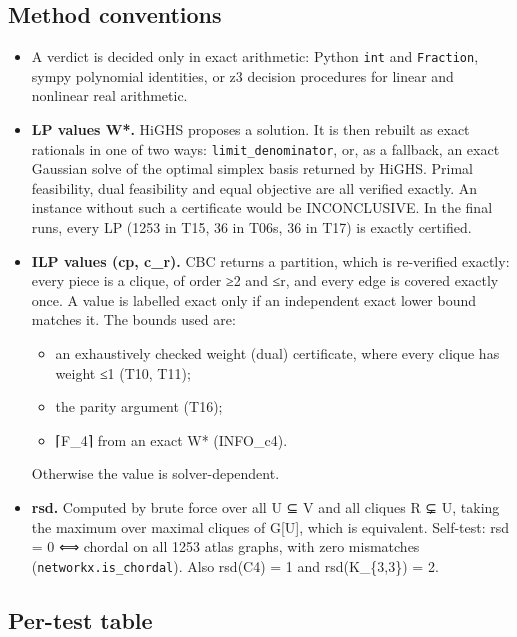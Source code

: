 \documentclass[
]{article}
\providecommand{\tightlist}{%
  \setlength{\itemsep}{0pt}\setlength{\parskip}{0pt}}
\begin{document}
\subsection{Method conventions}\label{method-conventions}

\begin{itemize}
\item
  A verdict is decided only in exact arithmetic: Python \texttt{int} and
  \texttt{Fraction}, sympy polynomial identities, or z3 decision
  procedures for linear and nonlinear real arithmetic.
\item
  \textbf{LP values W*.} HiGHS proposes a solution. It is then rebuilt
  as exact rationals in one of two ways: \texttt{limit\_denominator},
  or, as a fallback, an exact Gaussian solve of the optimal simplex
  basis returned by HiGHS. Primal feasibility, dual feasibility and
  equal objective are all verified exactly. An instance without such a
  certificate would be INCONCLUSIVE. In the final runs, every LP (1253
  in T15, 36 in T06s, 36 in T17) is exactly certified.
\item
  \textbf{ILP values (cp, c\_r).} CBC returns a partition, which is
  re-verified exactly: every piece is a clique, of order ≥2 and ≤r, and
  every edge is covered exactly once. A value is labelled exact only if
  an independent exact lower bound matches it. The bounds used are:

  \begin{itemize}
  \tightlist
  \item
    an exhaustively checked weight (dual) certificate, where every
    clique has weight ≤1 (T10, T11);
  \item
    the parity argument (T16);
  \item
    ⌈F\_4⌉ from an exact W* (INFO\_c4).
  \end{itemize}

  Otherwise the value is solver-dependent.
\item
  \textbf{rsd.} Computed by brute force over all U ⊆ V and all cliques R
  ⊊ U, taking the maximum over maximal cliques of G{[}U{]}, which is
  equivalent. Self-test: rsd = 0 ⟺ chordal on all 1253 atlas graphs,
  with zero mismatches (\texttt{networkx.is\_chordal}). Also rsd(C4) = 1
  and rsd(K\_\{3,3\}) = 2.
\end{itemize}

\subsection{Per-test table}\label{per-test-table}
\end{document}

